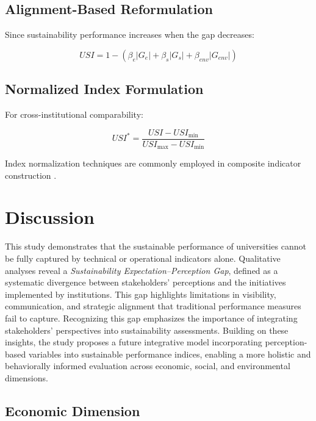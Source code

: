\documentclass[12pt,a4paper]{article}
\begin{document}
\subsection{Alignment-Based Reformulation}

Since sustainability performance increases when the gap decreases:

\begin{equation}
USI = 1 - \left( \beta_e |G_e| + \beta_s |G_s| + \beta_{env} |G_{env}| \right)
\label{eq:alignment}
\end{equation}

\subsection{Normalized Index Formulation}

For cross-institutional comparability:

\begin{equation}
USI^* = \frac{USI - USI_{\min}}{USI_{\max} - USI_{\min}}
\label{eq:normalized}
\end{equation}

Index normalization techniques are commonly employed in composite indicator construction \citep{OECD2008,Nardo2005}.

\section{Discussion}

This study demonstrates that the sustainable performance of universities cannot be fully captured by technical or operational indicators alone. Qualitative analyses reveal a \textit{Sustainability Expectation--Perception Gap}, defined as a systematic divergence between stakeholders’ perceptions and the initiatives implemented by institutions. This gap highlights limitations in visibility, communication, and strategic alignment that traditional performance measures fail to capture. Recognizing this gap emphasizes the importance of integrating stakeholders’ perspectives into sustainability assessments. Building on these insights, the study proposes a future integrative model incorporating perception-based variables into sustainable performance indices, enabling a more holistic and behaviorally informed evaluation across economic, social, and environmental dimensions.

\subsection{Economic Dimension}
\end{document}
